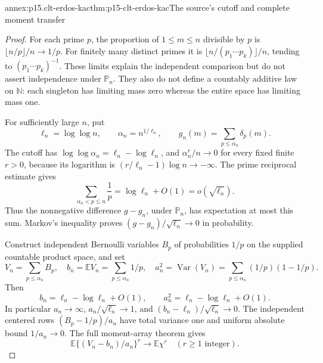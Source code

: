 \begin{annexitem}{annex:p15.clt-erdos-kac}{thm:p15-clt-erdos-kac}{The source's cutoff and complete moment transfer}
\begin{proof}
For each prime \(p\), the proportion of \(1\leq m\leq n\)
divisible by \(p\) is \(\lfloor n/p\rfloor/n\to1/p\).
For finitely many distinct primes it is
\(\lfloor n/(p_1\cdots p_k)\rfloor/n\), tending to
\((p_1\cdots p_k)^{-1}\). These limits explain the independent
comparison but do not assert independence under \(\mathbb P_n\).
They also do not define a countably additive law on
\(\mathbb N\): each singleton has limiting mass zero whereas
the entire space has limiting mass one.

For sufficiently large \(n\), put
\[
 \ell_n=\log\log n,\qquad
 \alpha_n=n^{1/\ell_n},\qquad
 g_n(m)=\sum_{p\leq\alpha_n}\delta_p(m).
 \]
The cutoff has
\(\log\log\alpha_n=\ell_n-\log\ell_n\), and
\(\alpha_n^r/n\to0\) for every fixed finite \(r>0\), because
its logarithm is \((r/\ell_n-1)\log n\to-\infty\).
The prime reciprocal estimate gives
\[
 \sum_{\alpha_n<p\leq n}\frac1p
      =\log\ell_n+O(1)=o(\sqrt{\ell_n}).
 \]
Thus the nonnegative difference \(g-g_n\), under
\(\mathbb P_n\), has expectation at most this sum. Markov's
inequality proves
\((g-g_n)/\sqrt{\ell_n}\to0\) in probability.

Construct independent Bernoulli variables \(B_p\) of probabilities
\(1/p\) on the supplied countable product space, and set
\[
 V_n=\sum_{p\leq\alpha_n}B_p,\quad
 b_n=\mathbb EV_n=\sum_{p\leq\alpha_n}1/p,\quad
 a_n^2=\operatorname{Var}(V_n)
      =\sum_{p\leq\alpha_n}(1/p)(1-1/p).
 \]
Then
\[
 b_n=\ell_n-\log\ell_n+O(1),\qquad
 a_n^2=\ell_n-\log\ell_n+O(1).
 \]
In particular \(a_n\to\infty\),
\(a_n/\sqrt{\ell_n}\to1\), and
\((b_n-\ell_n)/\sqrt{\ell_n}\to0\).
The independent centered rows \((B_p-1/p)/a_n\) have total
variance one and uniform absolute bound \(1/a_n\to0\).
The full moment-array theorem gives
\[
 \mathbb E\{(V_n-b_n)/a_n\}^r\to\mathbb E\chi^r
                                      \quad(r\geq1\text{ integer}).
 \]


\end{proof}
\end{annexitem}
